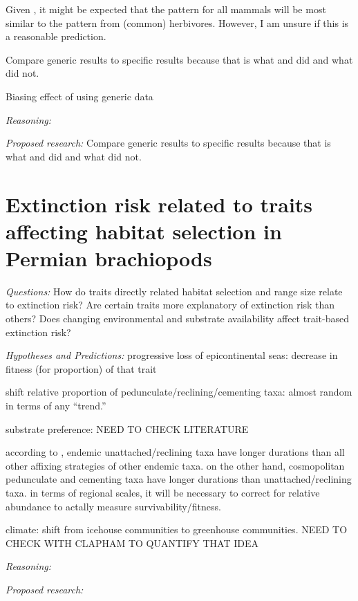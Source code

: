 \documentclass[12pt,letterpaper]{article}
\begin{document}
Given \citep{Jernvall2002}, it might be expected that the pattern for all mammals will be most similar to the pattern from (common) herbivores. However, I am unsure if this is a reasonable prediction.

Compare generic results to specific results because that is what \citet{Jernvall2002} and \citet{Jernvall2004} did and what \citet{Tomiya2013} did not.

Biasing effect of using generic data \citep{Raup1975}

\textit{Reasoning:}

\textit{Proposed research:}
Compare generic results to specific results because that is what \citet{Jernvall2002} and \citet{Jernvall2004} did and what \citet{Tomiya2013} did not.


\section{Extinction risk related to traits affecting habitat selection in Permian brachiopods}

\textit{Questions:} How do traits directly related habitat selection and range size relate to extinction risk? Are certain traits more explanatory of extinction risk than others? Does changing environmental and substrate availability affect trait-based extinction risk?

\textit{Hypotheses and Predictions:}
progressive loss of epicontinental seas: decrease in fitness (for proportion) of that trait

shift relative proportion of pedunculate/reclining/cementing taxa: almost random \citep{Clapham2007} in terms of any ``trend.'' 

substrate preference: NEED TO CHECK LITERATURE

according to \citet{Alexander1977}, endemic unattached/reclining taxa have longer durations than all other affixing strategies of other endemic taxa. on the other hand, cosmopolitan pedunculate and cementing taxa have longer durations than unattached/reclining taxa. in terms of regional scales, it will be necessary to correct for relative abundance to actally measure survivability/fitness.

climate: shift from icehouse communities to greenhouse communities. NEED TO CHECK WITH CLAPHAM TO QUANTIFY THAT IDEA


\textit{Reasoning:}

\textit{Proposed research:}
\end{document}
